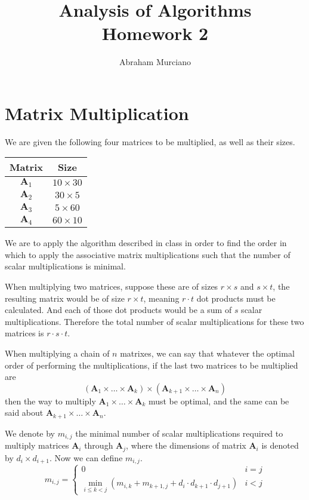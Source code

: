 \documentclass{article}
\title{Analysis of Algorithms \\
\medskip
\large Homework 2}
\author{Abraham Murciano}
\begin{document}
\maketitle

\section{Matrix Multiplication}

We are given the following four matrices to be multiplied, as well as their sizes.

\begin{table}[h]
	\centering
	\begin{tabular}{|c|c|}
		\hline
		Matrix           & Size \\
		\hline
		\(\mathbf{A}_1\) & \(10 \times 30\) \\
		\(\mathbf{A}_2\) & \(30 \times 5\) \\
		\(\mathbf{A}_3\) & \(5 \times 60\) \\
		\(\mathbf{A}_4\) & \(60 \times 10\) \\
		\hline
	\end{tabular}
\end{table}

We are to apply the algorithm described in class in order to find the order in which to apply the associative matrix multiplications such that the number of scalar multiplications is minimal.

When multiplying two matrices, suppose these are of sizes \(r \times s\) and \(s \times t\), the resulting matrix would be of size \(r \times t\), meaning \(r \cdot t\) dot products must be calculated. And each of those dot products would be a sum of \(s\) scalar multiplications. Therefore the total number of scalar multiplications for these two matrices is \(r \cdot s \cdot t\).

When multiplying a chain of \(n\) matrixes, we can say that whatever the optimal order of performing the multiplications, if the last two matrices to be multiplied are
\begin{equation*}
	(\mathbf{A}_1 \times \dots \times \mathbf{A}_k) \times (\mathbf{A}_{k+1} \times \dots \times \mathbf{A}_n)
\end{equation*}
then the way to multiply \(\mathbf{A}_1 \times \dots \times \mathbf{A}_k\) must be optimal, and the same can be said about \(\mathbf{A}_{k+1} \times \dots \times \mathbf{A}_n\).

We denote by \(m_{i,j}\) the minimal number of scalar multiplications required to multiply matrices \(\mathbf{A}_i\) through \(\mathbf{A}_j\), where the dimensions of matrix \(\mathbf{A}_i\) is denoted by \(d_i \times d_{i+1}\). Now we can define \(m_{i,j}\).
\begin{equation*}
	m_{i,j} =
	\begin{cases}
		0                                                                                                      & i = j \\
		\displaystyle\min_{i \leq k < j} \left( m_{i,k} + m_{k+1, j} + d_i \cdot d_{k+1} \cdot d_{j+1} \right) & i < j
	\end{cases}
\end{equation*}
\end{document}
